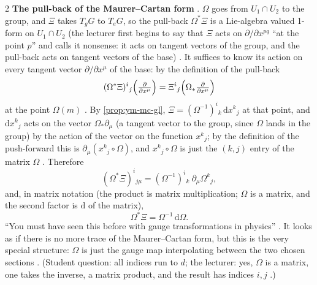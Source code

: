 \begin{paracol}{2}
\textbf{The pull-back of the Maurer--Cartan form}  . $\Omega$ goes from $U_1\cap U_2$ to the group, and $\Xi$ takes $T_gG$ to $T_eG$, so the pull-back $\Omega^*\Xi$ is a Lie-algebra valued 1-form on $U_1\cap U_2$ (the lecturer first begins to say that $\Xi$ acts on $\partial/\partial x^{pq}$ ``at the point $p$'' and calls it nonsense: it acts on tangent vectors of the group, and the pull-back acts on tangent vectors of the base)     . It suffices to know its action on every tangent vector $\partial/\partial x^\mu$ of the base: by the definition of the pull-back
\[
  (\Omega^*\Xi)^i{}_j\Bigl(\tfrac{\partial}{\partial x^\mu}\Bigr)=\Xi^i{}_j\Bigl(\Omega_*\tfrac{\partial}{\partial x^\mu}\Bigr)
\]
at the point $\Omega(m)$   . By \cref{prop:ym-mc-gl}, $\Xi=(\Omega^{-1})^i{}_k\,\mathrm dx^k{}_j$ at that point, and $\mathrm dx^k{}_j$ acts on the vector $\Omega_*\partial_\mu$ (a tangent vector to the group, since $\Omega$ lands in the group) by the action of the vector on the function $x^k{}_j$; by the definition of the push-forward this is $\partial_\mu(x^k{}_j\circ\Omega)$, and $x^k{}_j\circ\Omega$ is just the $(k,j)$ entry of the matrix $\Omega$           . Therefore
\[
  (\Omega^*\Xi)^i{}_{j\mu}=(\Omega^{-1})^i{}_k\ \partial_\mu\Omega^k{}_j ,
\]
     and, in matrix notation (the product is matrix multiplication; $\Omega$ is a matrix, and the second factor is $\mathrm d$ of the matrix),
\[
  \Omega^*\Xi=\Omega^{-1}\,\mathrm d\Omega .
\]
``You must have seen this before with gauge transformations in physics''  . It looks as if there is no more trace of the Maurer--Cartan form, but this is the very special structure: $\Omega$ is just the gauge map interpolating between the two chosen sections . (Student question: all indices run to $d$; the lecturer: yes, $\Omega$ is a matrix, one takes the inverse, a matrix product, and the result has indices $i,j$  .)


\end{paracol}
